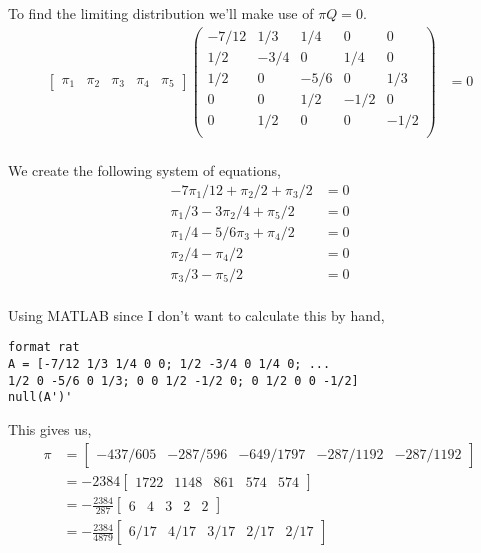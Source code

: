 \documentclass{article}
\begin{document}
To find the limiting distribution we'll make use of $\pi Q = 0$.
\begin{align*}
    \begin{bmatrix}
        \pi_1 & \pi_2 & \pi_3 & \pi_4 & \pi_5
    \end{bmatrix}
    \begin{pmatrix}
        -7/12        & 1/3          & 1/4          & 0      & 0 \\
        1/2          & -3/4         & 0            & 1/4    & 0 \\
        1/2          & 0            & -5/6         & 0      & 1/3 \\
        0            & 0            & 1/2          & -1/2   & 0 \\
        0            & 1/2          & 0            & 0      & -1/2 \\
    \end{pmatrix}
    &= 0 \\
\end{align*}

We create the following system of equations,
\begin{align}
    -7\pi_1/12 + \pi_2/2 + \pi_3/2 &= 0 \\
    \pi_1/3 - 3\pi_2/4 + \pi_5/2 &= 0 \\
    \pi_1/4 - 5/6\pi_3 + \pi_4/2 &= 0 \\
    \pi_2/4 - \pi_4/2 &= 0 \\
    \pi_3/3 - \pi_5/2 &= 0 \\
\end{align}

Using MATLAB since I don't want to calculate this by hand,
\begin{verbatim}
format rat
A = [-7/12 1/3 1/4 0 0; 1/2 -3/4 0 1/4 0; ...
1/2 0 -5/6 0 1/3; 0 0 1/2 -1/2 0; 0 1/2 0 0 -1/2]
null(A')'
\end{verbatim}

This gives us,
\begin{align*}
    \pi &=
    \begin{bmatrix}
        -437/605 & -287/596 & -649/1797 & -287/1192 & -287/1192
    \end{bmatrix} \\
    &=
    -2384
    \begin{bmatrix}
        1722 & 1148 & 861 & 574 & 574
    \end{bmatrix} \\
    &=
    -\frac{2384}{287}
    \begin{bmatrix}
        6 & 4 & 3 & 2 & 2
    \end{bmatrix} \\
    &=
    -\frac{2384}{4879}
    \begin{bmatrix}
        6/17 & 4/17 & 3/17 & 2/17 & 2/17
    \end{bmatrix} \\
\end{align*}
\end{document}
